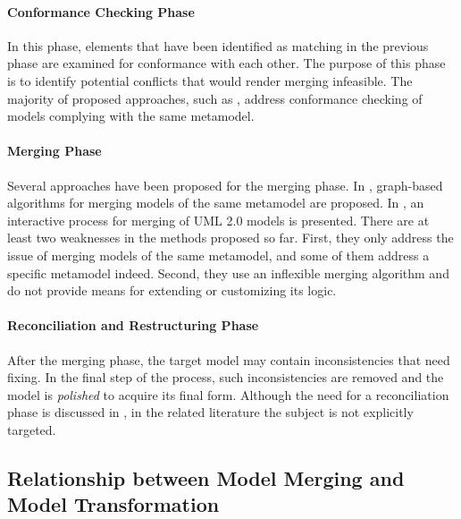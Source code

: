 
\paragraph{Conformance Checking Phase} In this phase, elements that have been identified as matching in the previous phase are examined for conformance with each other. The purpose of this phase is to identify potential conflicts that would render merging infeasible. The majority of proposed approaches, such as \cite{Letkeman2005}, address conformance checking of models complying with the same metamodel. 
 
\paragraph{Merging Phase}
Several approaches have been proposed for the merging phase. In \cite{Pottinger2003,Melnik2003}, graph-based algorithms for merging models of the same metamodel are proposed. In \cite{Letkeman2005}, an interactive process for merging of UML 2.0 models is presented. There are at least two weaknesses in the methods proposed so far. First, they only address the issue of merging models of the same metamodel, and some of them address a specific metamodel indeed. Second, they use an inflexible merging algorithm and do not provide means for extending or customizing its logic.

\paragraph{Reconciliation and Restructuring Phase}
After the merging phase, the target model may contain inconsistencies that need fixing. In the final step of the process, such inconsistencies are removed and the model is \textit{polished} to acquire its final form. Although the need for a reconciliation phase is discussed in \cite{Batini1986,Melnik2003}, in the related literature the subject is not explicitly targeted.

\subsection{Relationship between Model Merging and Model Transformation}

